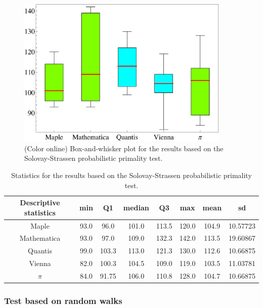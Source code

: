 \documentclass[10pt]{article}%
\begin{document}
\begin{figure}[htbp] %
   \centering
   \includegraphics[width=4in]{2009-QvPR-boxsolovey}
   \caption{(Color online) Box-and-whisker plot for the results based on the Solovay-Strassen probabilistic primality test.}
   \label{fig:example4}
\end{figure}

\begin{table}
   \caption{Statistics for the results based on the
Solovay-Strassen probabilistic primality test.}\label{tab:4}
\begin{center}
\begin{tabular}
[c]{ c c c c c c c c }%
\hline\hline
Descriptive statistics & min & Q1 & median & Q3 & max & mean & sd\\\hline
Maple & 93.0 & 96.0 & 101.0 & 113.5 & 120.0 & 104.9 & 10.57723\\
Mathematica & 93.0 & 97.0 & 109.0 & 132.3 & 142.0 & 113.5 & 19.60867\\
Quantis & 99.0 & 103.3 & 113.0 & 121.3 & 130.0 & 112.6 & 10.66875\\
Vienna & 82.0 & 100.3 & 104.5 & 109.0 & 119.0 & 103.5 & 11.03781\\
$\pi$ & 84.0 & 91.75 & 106.0 & 110.8 & 128.0 & 104.7 & 10.66875\\\hline  \hline
\end{tabular}
\end{center}
\end{table}


\subsubsection{Test based on random walks}

\end{document}
